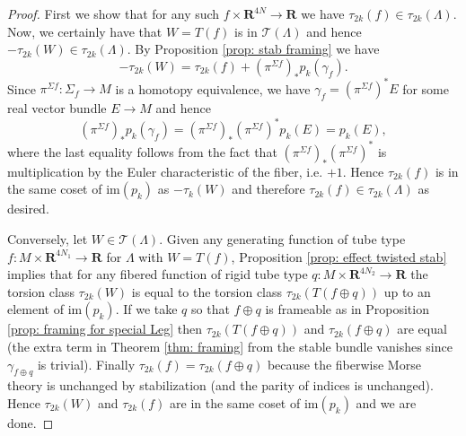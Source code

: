 \documentclass[10pt,a4paper]{amsart}
\def\bR{\mathbf{R}}
\newcommand\cT{\mathcal{T}}
\begin{document}
\begin{proof}
First we show that for any such $f \times \bR^{4N} \to \bR$ we have $\tau_{2k}(f) \in \tau_{2k}(\Lambda)$. Now, we certainly have that $W=T(f)$ is in $\cT(\Lambda)$ and hence $-\tau_{2k}(W) \in \tau_{2k}(\Lambda)$. By Proposition \ref{prop: stab framing} we have
$$ -\tau_{2k}(W) =\tau_{2k}(f) + (\pi^{\Sigma f})_*p_k(\gamma_f). $$
Since $\pi^{\Sigma f}: \Sigma_f \to M$ is a homotopy equivalence, we have $\gamma_f=(\pi^{\Sigma f})^*E$ for some real vector bundle $E \to M$ and hence
$$ (\pi^{\Sigma f})_*p_k(\gamma_f) = (\pi^{\Sigma f})_*(\pi^{\Sigma f})^*p_k(E)=p_k(E), $$
where the last equality follows from the fact that $(\pi^{\Sigma f})_*(\pi^{\Sigma f})^*$ is multiplication by the Euler characteristic of the fiber, i.e. $+1$. Hence $\tau_{2k}(f)$ is in the same coset of $\text{im}(p_k)$ as $-\tau_k(W)$ and therefore $\tau_{2k}(f) \in \tau_{2k}(\Lambda)$ as desired.

Conversely, let $W \in \cT(\Lambda)$. Given any generating function of tube type $f:M \times \bR^{4N_1} \to \bR$ for $\Lambda$ with $W=T(f)$, Proposition \ref{prop: effect twisted stab} implies that for any fibered function of rigid tube type $q:M \times \bR^{4N_2} \to \bR$ the torsion class $\tau_{2k}(W)$ is equal to the torsion class $\tau_{2k}(T(f \oplus q))$  up to an element of $\text{im}(p_k)$. If we take $q$ so that $f \oplus q$ is frameable as in Proposition \ref{prop: framing for special Leg} then $\tau_{2k}(T(f \oplus q))$ and $\tau_{2k}(f \oplus q)$ are equal (the extra term in Theorem \ref{thm: framing} from the stable bundle vanishes since $\gamma_{f \oplus q}$ is trivial). Finally $\tau_{2k}(f)=\tau_{2k}( f \oplus q)$ because the fiberwise Morse theory is unchanged by stabilization (and the parity of indices is unchanged). Hence $\tau_{2k}(W)$ and $\tau_{2k}(f)$ are in the same coset of $\text{im}(p_k)$ and we are done. %
\end{proof}
\end{document}
